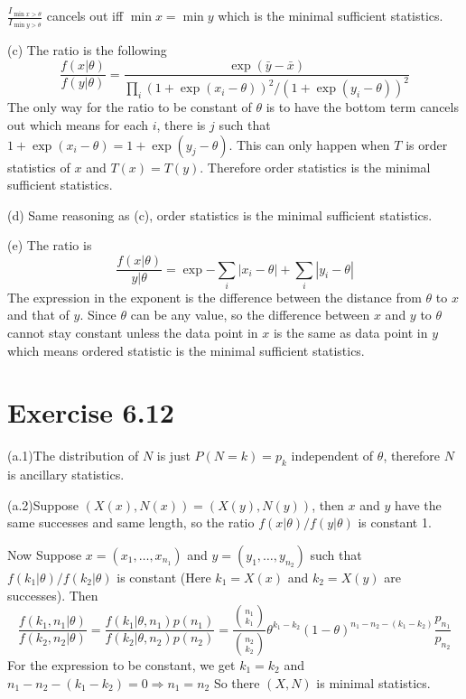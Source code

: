 \documentclass[12pt]{article}
\begin{document}
$\frac{I_{\min{x} > \theta }}{I_{\min{y} > \theta }}$ cancels out iff $\min x = \min y$ which is the minimal sufficient statistics.

(c) The ratio is the following 
$$
 \frac{f(x|\theta)}{f(y|\theta)} = \frac{\exp(\bar{y} - \bar{x})}{\prod_i (1 + \exp(x_i - \theta))^2/(1+ \exp(y_i - \theta))^2 }
$$
The only way for the ratio to be constant of $\theta$ is to have the bottom term cancels out which means for each $i$, there is $j$ such that $1 + \exp(x_i - \theta) = 1 + \exp(y_j - \theta)$. This can only happen when $T$ is order statistics of $x$ and $T(x) = T(y)$. Therefore order statistics is the minimal sufficient statistics.

(d) Same reasoning as (c),  order statistics is the minimal sufficient statistics.

(e) The ratio is $$
\frac{f(x|\theta)}{y|\theta} = \exp{- \sum_i |x_i - \theta| + \sum_i |y_i - \theta|}
$$
The expression in the exponent is the difference between the distance from $\theta$ to $x$ and that of $y$. Since $\theta$ can be any value, so the difference between $x$ and $y$ to $\theta$ cannot stay constant unless the data point in $x$ is the same as data point in $y$ which means ordered statistic is the minimal sufficient statistics.

\section*{Exercise 6.12}
(a.1)The distribution of $N$ is just $P(N=k) = p_k$ independent of $\theta$, therefore $N$ is ancillary statistics.

(a.2)Suppose $(X(x), N(x)) = (X(y), N(y))$, then $x$ and $y$ have the same successes and same length, so the ratio $f(x|\theta) / f(y|\theta)$ is constant 1.

Now Suppose $x=(x_1,\ldots, x_{n_1})$ and $y=(y_1,\ldots,y_{n_2})$ such that $f(k_1|
\theta) / f(k_2|\theta)$ is constant  (Here $k_1 = X(x)$ and $k_2 = X(y)$ are successes).  Then $$
  \frac{f(k_1, n_1|\theta)}{f(k_2, n_2|\theta)} = \frac{f(k_1|\theta, n_1)p(n_1)}{f(k_2 |\theta, n_2)p(n_2)} = \frac{{n_1 \choose k_1}}{{n_2 \choose k_2}} \theta^{k_1 - k_2} (1-\theta)^{n_1 -n_2 - (k_1-k_2)} \frac{p_{n_1}}{p_{n_2}} $$
For the expression to be constant, we get $k_1=k_2$ and $n_1 -n_2 - (k_1 -k_2) = 0 \Rightarrow n_1 = n_2$ So there $(X,N)$ is minimal statistics.
\end{document}
